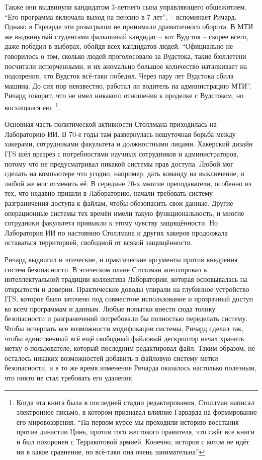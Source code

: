 Также они выдвинули кандидатом 3-летнего сына управляющего общежитием. \enquote{Его программа включала выход на пенсию в 7 лет}, -- вспоминает Ричард. Однако в Гарварде эти розыгрыши не принимали драматичного оборота. В МТИ же выдвинутый студентами фальшивый кандидат -- кот Вудсток -- скорее всего, даже победил в выборах, обойдя всех кандидатов-людей. \enquote{Официально не говорилось о том, сколько людей проголосовало за Вудстока, такие бюллетени посчитали испорченными, и их аномально большое количество наталкивает на подозрения, что Вудсток всё-таки победил. Через пару лет Вудстока сбила машина. До сих пор неизвестно, работал ли водитель на администрацию МТИ}. Ричард говорит, что не имел никакого отношения к проделке с Вудстоком, но восхищался ею. \footnote{Когда эта книга была в последней стадии редактирования, Столлман написал электронное письмо, в котором признавал влияние Гарварда на формирование его мировоззрения. \enquote{На первом курсе мы проходили историю восстания против династии Цинь, против того жестокого правителя, что сжёг все книги и был похоронен с Терракотовой армией. Конечно, история с котом не идёт ни в какое сравнение, но всё-таки она очень занимательна}}.

Основная часть политической активности Столлмана приходилась на Лабораторию ИИ. В 70-е годы там развернулась нешуточная борьба между хакерами, сотрудниками факультета и должностными лицами. Хакерский дизайн ITS шёл вразрез с потребностями научных сотрудников и администраторов, потому что не предусматривал никакой системы прав доступа. Любой мог сделать на компьютере что угодно, например, дать команду на выключение, и любой же мог отменить её. В середине 70-х многие преподаватели, особенно из тех, что недавно пришли в Лабораторию, начали требовать систему разграничения доступа к файлам, чтобы обезопасить свои данные. Другие операционные системы тех времён имели такую функциональность, и многие сотрудники факультета привыкли к этому чувству защищённости. Но Лаборатория ИИ по настоянию Столлмана и других хакеров продолжала оставаться территорией, свободной от всякой защищённости.

Ричард выдвигал и этические, и практические аргументы против внедрения систем безопасности. В этическом плане Столлман апеллировал к интеллектуальной традиции коллектива Лаборатории, которая основывалась на открытости и доверии. Практические доводы упирали на глубинное устройство ITS, которое было заточено под совместное использование и прозрачный доступ ко всем программам и данным. Любые попытки внести сюда толику безопасности и разграничений потребовали бы полностью переделать систему. Чтобы исчерпать все возможности модификации системы, Ричард сделал так, чтобы единственный всё ещё свободный файловый дескриптор начал хранить метку о пользователе, который последним редактировал файл. Таким образом, не осталось никаких возможностей добавить в файловую систему метки безопасности, и в то же время изменение Ричарда оказалось настолько полезным, что никто не стал требовать его удаления.

